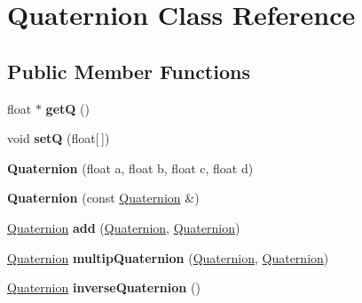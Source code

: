 \hypertarget{class_quaternion}{\section{Quaternion Class Reference}
\label{class_quaternion}
}
\subsection*{Public Member Functions}
\begin{DoxyCompactItemize}
\item 
\hypertarget{class_quaternion_a956c85d7402b543b397f248276bca7da}{float $\ast$ {\bfseries get\-Q} ()}\label{class_quaternion_a956c85d7402b543b397f248276bca7da}

\item 
\hypertarget{class_quaternion_afd5d828d67ba62d3356968c1a059e576}{void {\bfseries set\-Q} (float\mbox{[}$\,$\mbox{]})}\label{class_quaternion_afd5d828d67ba62d3356968c1a059e576}

\item 
\hypertarget{class_quaternion_a3c59d086647a566ee5b2255e11c5497f}{{\bfseries Quaternion} (float a, float b, float c, float d)}\label{class_quaternion_a3c59d086647a566ee5b2255e11c5497f}

\item 
\hypertarget{class_quaternion_a9e1742f304fd5d2a943d673210c7bf5d}{{\bfseries Quaternion} (const \hyperlink{class_quaternion}{Quaternion} \&)}\label{class_quaternion_a9e1742f304fd5d2a943d673210c7bf5d}

\item 
\hypertarget{class_quaternion_aa15bcb34da9212a6d3a0e8d2fe38a18f}{\hyperlink{class_quaternion}{Quaternion} {\bfseries add} (\hyperlink{class_quaternion}{Quaternion}, \hyperlink{class_quaternion}{Quaternion})}\label{class_quaternion_aa15bcb34da9212a6d3a0e8d2fe38a18f}

\item 
\hypertarget{class_quaternion_a22d27c24da673a357b90dc81ab951301}{\hyperlink{class_quaternion}{Quaternion} {\bfseries multip\-Quaternion} (\hyperlink{class_quaternion}{Quaternion}, \hyperlink{class_quaternion}{Quaternion})}\label{class_quaternion_a22d27c24da673a357b90dc81ab951301}

\item 
\hypertarget{class_quaternion_a21a94e98f57a05335a5ba568724525b9}{\hyperlink{class_quaternion}{Quaternion} {\bfseries inverse\-Quaternion} ()}\label{class_quaternion_a21a94e98f57a05335a5ba568724525b9}


\end{DoxyCompactItemize}
